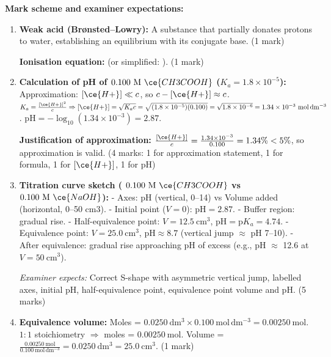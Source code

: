 \documentclass[11pt]{article}
\begin{document}
\begin{corrige}
\textbf{Mark scheme and examiner expectations:}
\begin{enumerate}
\item \textbf{Weak acid (Brønsted–Lowry):} A substance that partially donates protons to water, establishing an equilibrium with its conjugate base. \hfill (1 mark)
\par \textbf{Ionisation equation:}  (or simplified: ). \hfill (1 mark)
\item \textbf{Calculation of pH of $0.100\ \mathrm{M}\ \ce{CH3COOH}$ ($K_a = 1.8\times 10^{-5}$):}
Approximation: $[\ce{H+}] \ll c$, so $c - [\ce{H+}] \approx c$.
$K_a = \frac{[\ce{H+}]^2}{c} \Rightarrow [\ce{H+}] = \sqrt{K_a c} = \sqrt{(1.8\times 10^{-5})(0.100)} = \sqrt{1.8\times 10^{-6}} = 1.34\times 10^{-3}\ \mathrm{mol\,dm^{-3}}$.
$\mathrm{pH} = -\log_{10}(1.34\times 10^{-3}) = \mathbf{2.87}$.
\par \textbf{Justification of approximation:} $\frac{[\ce{H+}]}{c} = \frac{1.34\times 10^{-3}}{0.100} = 1.34\% < 5\%$, so approximation is valid. \hfill (4 marks: 1 for approximation statement, 1 for formula, 1 for $[\ce{H+}]$, 1 for pH)
\item \textbf{Titration curve sketch ( $0.100\ \mathrm{M}\ \ce{CH3COOH}$ vs $0.100\ \mathrm{M}\ \ce{NaOH}$):} 
- Axes: pH (vertical, 0--14) vs Volume  added (horizontal, 0--50 cm3).
- Initial point ($V=0$): $\mathrm{pH} = 2.87$.
- Buffer region: gradual rise.
- Half-equivalence point: $V = 12.5\ \mathrm{cm^3}$, $\mathrm{pH} = \mathrm{p}K_a = 4.74$.
- Equivalence point: $V = 25.0\ \mathrm{cm^3}$, $\mathrm{pH} \approx 8.7$ (vertical jump $\approx$ pH 7--10).
- After equivalence: gradual rise approaching pH of excess  (e.g., pH $\approx$ 12.6 at $V=50\ \mathrm{cm^3}$).
\par \emph{Examiner expects:} Correct S-shape with asymmetric vertical jump, labelled axes, initial pH, half-equivalence point, equivalence point volume and pH. \hfill (5 marks)
\item \textbf{Equivalence volume:} Moles  = $0.0250\ \mathrm{dm^3} \times 0.100\ \mathrm{mol\,dm^{-3}} = 0.00250\ \mathrm{mol}$. $1:1$ stoichiometry $\Rightarrow$ moles  = $0.00250\ \mathrm{mol}$. Volume = $\frac{0.00250\ \mathrm{mol}}{0.100\ \mathrm{mol\,dm^{-3}}} = 0.0250\ \mathrm{dm^3} = \mathbf{25.0\ \mathrm{cm^3}}$. \hfill (1 mark)

\end{enumerate}
\end{corrige}
\end{document}
